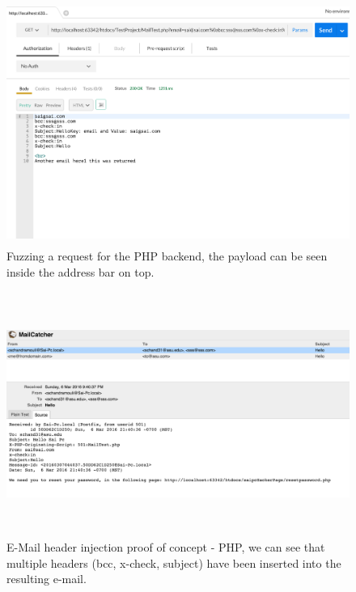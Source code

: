 \begin{figure}[!htbp]
	\centering
	\includegraphics[width=14cm, height=8cm]{System/EMI_Postman_PHP}
	\caption[]{Fuzzing a request for the PHP backend, the payload can be seen inside the address bar on top.}
	\label{fig:postmanphp}
\end{figure}

\begin{figure}[!htbp]
	\centering
	\includegraphics[width=14cm, height=8cm]{System/EMI_Mailcatcher_PHP}
	\caption[]{E-Mail header injection proof of concept - PHP, we can see that multiple headers (bcc, x-check, subject) have been inserted into the resulting e-mail.}
	\label{fig:mailcatcherphp}
\end{figure}